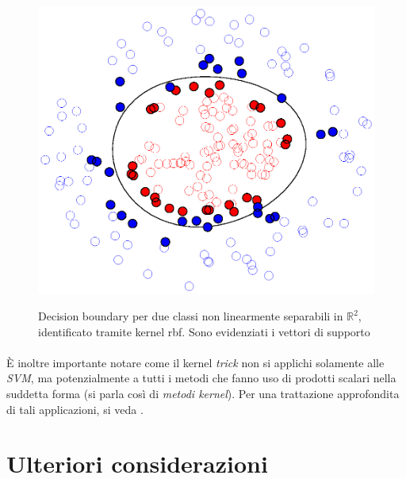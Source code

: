 \begin{figure}[H] %
 	\centering	
	
	\fboxsep=0mm%
	\fboxrule=1mm%

	 {
		\includegraphics[scale=1]{img/rbfkern.eps}		
	}	
	\caption{Decision boundary per due classi non linearmente separabili in $\mathbb{R}^2$, identificato tramite kernel rbf. Sono evidenziati i vettori di supporto}
\end{figure}

\paragraph{}
È inoltre importante notare come il kernel \textit{trick} non si applichi solamente alle \textit{SVM}, ma potenzialmente a tutti i metodi che fanno uso di prodotti scalari nella suddetta forma (si parla così di \textit{metodi kernel}). Per una trattazione approfondita di tali applicazioni, si veda \cite{kernels}.


\section{Ulteriori considerazioni}

